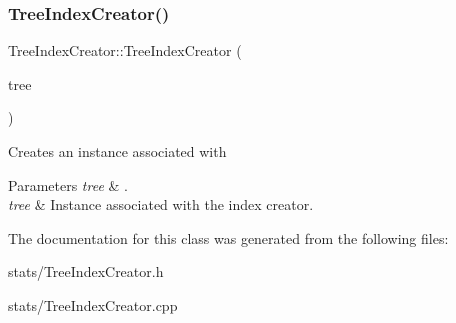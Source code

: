 \subsubsection{\texorpdfstring{Tree\+Index\+Creator()}{TreeIndexCreator()}}
{\footnotesize\ttfamily Tree\+Index\+Creator\+::\+Tree\+Index\+Creator (\begin{DoxyParamCaption}\item[{\mbox{\hyperlink{class_abstract_c_c_o_tree}{Abstract\+C\+C\+O\+Tree}} $\ast$}]{tree }\end{DoxyParamCaption})}

Creates an instance associated with
\begin{DoxyParams}{Parameters}
{\em tree} & . \\
\hline
{\em tree} & Instance associated with the index creator. \\
\hline
\end{DoxyParams}


The documentation for this class was generated from the following files\+:\begin{DoxyCompactItemize}
\item 
stats/Tree\+Index\+Creator.\+h\item 
stats/Tree\+Index\+Creator.\+cpp\end{DoxyCompactItemize}
